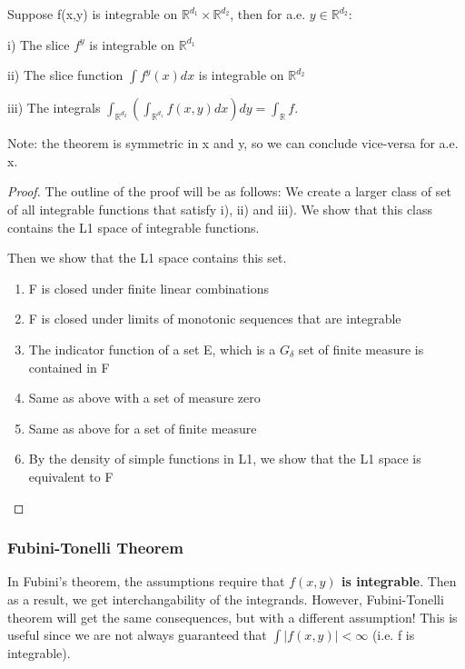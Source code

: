 \documentclass[class=article, crop=false]{standalone}
\begin{document}
		\begin{theorem} 
			Suppose f(x,y) is integrable on $\mathbb{R}^{d_1} \times \mathbb{R}^{d_2}$, then for a.e. $y \in \mathbb{R}^{d_2}$:

			i) The slice $f^y$ is integrable on $\mathbb{R}^{d_1}$

			ii) The slice function $\int f^y(x) dx$ is integrable on $\mathbb{R}^{d_2}$

			iii) The integrals $\int_{\mathbb{R}^{d_2}} ( \int_{\mathbb{R}^{d_1}} f(x, y) dx) dy = \int_{\mathbb{R}} f$. 

			Note: the theorem is symmetric in x and y, so we can conclude vice-versa for a.e. x.
		\end{theorem}
		\begin{proof}
			The outline of the proof will be as follows: We create a larger class of set of all integrable functions that satisfy i), ii) and iii). We show that this class contains the L1 space of integrable functions.

			Then we show that the L1 space contains this set.
			\begin{enumerate}
				\item F is closed under finite linear combinations
				\item F is closed under limits of monotonic sequences that are integrable
				\item The indicator function of a set E, which is a $G_\delta$ set of finite measure is contained in F
				\item Same as above with a set of measure zero
				\item Same as above for a set of finite measure
				\item By the density of simple functions in L1, we show that the L1 space is equivalent to F
			\end{enumerate}

			

		\end{proof}

		\subsubsection{Fubini-Tonelli Theorem}
			In Fubini's theorem, the assumptions require that \textbf{$f(x,y)$ is integrable}. Then as a result, we get interchangability of the integrands. However, Fubini-Tonelli theorem will get the same consequences, but with a different assumption! This is useful since we are not always guaranteed that $\int |f(x,y)| < \infty$ (i.e. f is integrable). 
\end{document}
